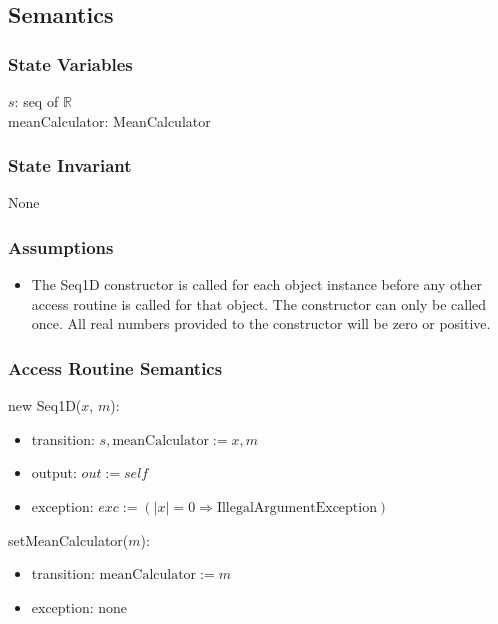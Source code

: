 \documentclass[12pt,fleqn]{examtst}
\begin{document}
\subsection* {Semantics}

\subsubsection* {State Variables}

$s$: seq of $\mathbb{R}$\\
meanCalculator: MeanCalculator

\subsubsection* {State Invariant}

None

\subsubsection* {Assumptions}

\begin{itemize}
\item The Seq1D constructor is called for each object instance before any other
  access routine is called for that object.  The constructor can only be called
  once.  All real numbers provided to the constructor will be zero or positive.
\end{itemize}

\subsubsection* {Access Routine Semantics}

new Seq1D($x$, $m$):
\begin{itemize}
\item transition: $s, \text{meanCalculator} := x, m$
\item output: $\mathit{out} := \mathit{self}$
\item exception:
  $\mathit{exc} := (|x| = 0 \Rightarrow \mbox{IllegalArgumentException})$
\end{itemize}

\noindent setMeanCalculator($m$):
\begin{itemize}
\item transition: $\mbox{meanCalculator} := m$
\item exception: none
\end{itemize}
\end{document}
